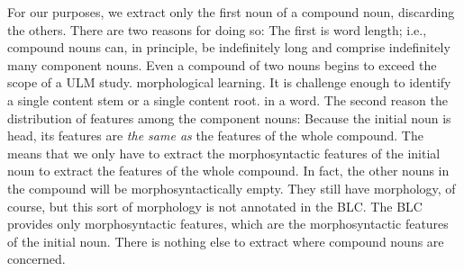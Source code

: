 
For our purposes, we extract only the first noun of a compound noun, discarding the others. %
There are two reasons for doing so: %
The first is word length; 
i.e., compound nouns can, in principle, be indefinitely long and comprise
indefinitely many component nouns. 
Even a compound of two nouns begins to exceed the scope of a ULM study. morphological learning. 
It is challenge enough to identify a single content stem or a single content root.  in a word. 
The second reason the distribution 
of features among the component nouns: Because the initial noun is head, its 
features are \emph{the same as} the features of the whole compound. The means that we only 
have to extract the morphosyntactic features of the initial noun to extract the features of the whole 
compound. In fact, the other nouns in the compound will be morphosyntactically empty. They still have
morphology, of course, but this sort of morphology is not annotated in the \ac{BLC}. The \ac{BLC} provides only morphosyntactic features, which are the morphosyntactic features of the initial noun. There is nothing else to extract where compound nouns are
concerned. %

